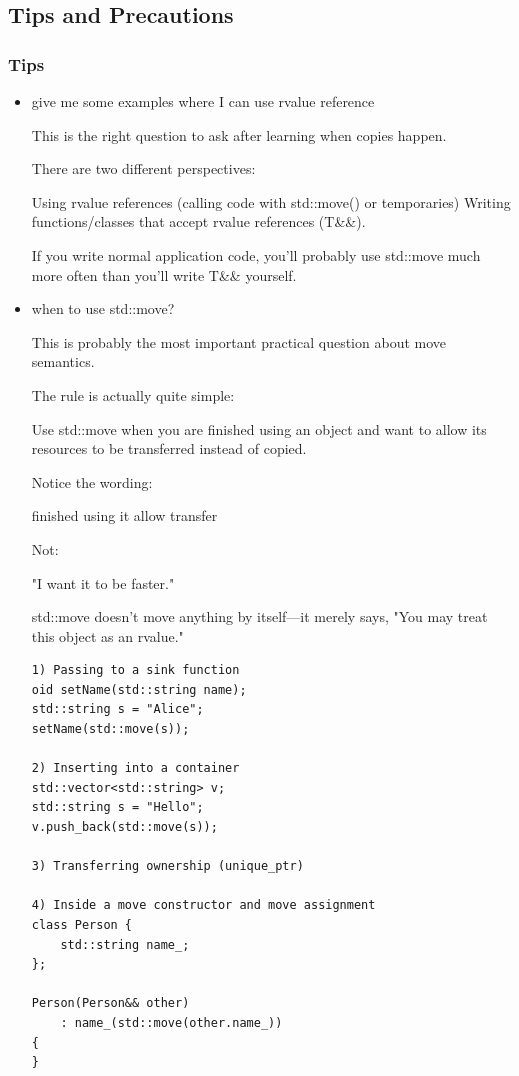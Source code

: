 \documentclass[a4paper,11pt,twoside]{book}
\begin{document}
\subsection{Tips and Precautions}
\subsubsection{Tips}
\begin{itemize}

	\item give me some examples where I can use rvalue reference
	
	This is the right question to ask after learning when copies happen.
	
	There are two different perspectives:
	
	Using rvalue references (calling code with std::move() or temporaries)
	Writing functions/classes that accept rvalue references (T\&\&).  
	
	If you write normal application code, you'll probably use std::move much more often than you'll write T\&\& yourself.
	
	\item when to use std::move?
	
This is probably the most important practical question about move semantics.

The rule is actually quite simple:

Use std::move when you are finished using an object and want to allow its resources to be transferred instead of copied.

Notice the wording:

finished using it allow transfer 

Not:

"I want it to be faster."

std::move doesn't move anything by itself—it merely says, "You may treat this object as an rvalue."	

\begin{lstlisting}
1) Passing to a sink function
oid setName(std::string name);
std::string s = "Alice";
setName(std::move(s));

2) Inserting into a container
std::vector<std::string> v;
std::string s = "Hello";
v.push_back(std::move(s));

3) Transferring ownership (unique_ptr)

4) Inside a move constructor and move assignment
class Person {
    std::string name_;
};

Person(Person&& other)
    : name_(std::move(other.name_))
{
}


\end{lstlisting}
\end{itemize}
\end{document}
